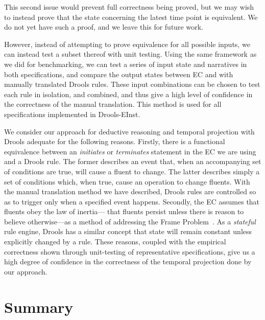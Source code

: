 
This second issue would prevent full correctness being proved, but we may wish
to instead prove that the state concerning the latest time point is
equivalent. We do not yet have such a proof, and we leave this for future work.

However, instead of attempting to prove equivalence for all possible inputs,
we can instead test a subset thereof with unit testing. Using the same
framework as we did for benchmarking, we can test a series of input state and
narratives in both specifications, and compare the output states between
\ac{EC} and with manually translated Drools rules. These input combinations can be
chosen to test each rule in isolation, and combined, and thus give a high
level of confidence in the correctness of the manual translation. This method is used
for all specifications implemented in Drools-EInst.

We consider our approach for deductive reasoning and temporal projection
with Drools adequate for the following reasons. Firstly, there is a functional
equivalence between an \emph{initiates} or \emph{terminates} statement in the
\ac{EC} we are using and a Drools rule. The former describes an event that, when an
accompanying set of conditions are true, will cause a fluent to change. The
latter describes simply a set of conditions which, when true, cause an
operation to change fluents. With the manual translation method we have described,
Drools rules are controlled so as to trigger only when a specified event
happens. Secondly, the \ac{EC} assumes that fluents obey the law of inertia---
that fluents persist unless there is reason to believe otherwise---as a method
of addressing the Frame Problem~\citep{Shanahan1999}. As a \emph{stateful}
rule engine, Drools has a similar concept that state will remain constant
unless explicitly changed by a rule. These reasons, coupled with the empirical
correctness shown through unit-testing of representative specifications, give
us a high degree of confidence in the correctness of the temporal projection done by our approach.

\section{Summary}

